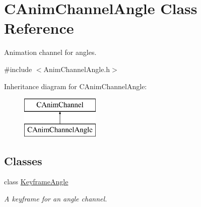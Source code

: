 \hypertarget{class_c_anim_channel_angle}{\section{C\+Anim\+Channel\+Angle Class Reference}
\label{class_c_anim_channel_angle}
}


Animation channel for angles.  




{\ttfamily \#include $<$Anim\+Channel\+Angle.\+h$>$}

Inheritance diagram for C\+Anim\+Channel\+Angle\+:\begin{figure}[H]
\begin{center}
\leavevmode
\includegraphics[height=2.000000cm]{class_c_anim_channel_angle}
\end{center}
\end{figure}
\subsection*{Classes}
\begin{DoxyCompactItemize}
\item 
class \hyperlink{class_c_anim_channel_angle_1_1_keyframe_angle}{Keyframe\+Angle}
\begin{DoxyCompactList}\small\item\em A keyframe for an angle channel. \end{DoxyCompactList}\end{DoxyCompactItemize}
